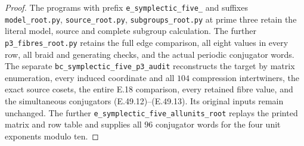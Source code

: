 \begin{proof}
The programs with prefix \texttt{e\_symplectic\_five\_}
and suffixes \texttt{model\_root.py},
\texttt{source\_root.py}, \texttt{subgroups\_root.py}
at prime three retain the literal model, source and complete
subgroup calculation.  The further
\texttt{p3\_fibres\_root.py} retains the full edge comparison,
all eight values in every row, all braid and generating checks,
and the actual periodic conjugator words.
The separate \texttt{bc\_symplectic\_five\_p3\_audit}
reconstructs the target by matrix enumeration, every induced
coordinate and all $104$ compression intertwiners, the exact
source cosets, the entire E.18 comparison, every retained
fibre value, and the simultaneous conjugators
\textup{(E.49.12)--(E.49.13)}.  Its original inputs remain
unchanged.
The further \texttt{e\_symplectic\_five\_allunits\_root}
replays the printed matrix and row table and supplies all
$96$ conjugator words for the four unit exponents modulo ten.
\end{proof}
